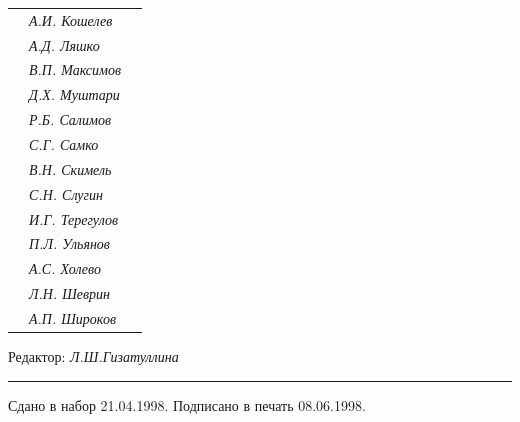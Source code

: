 \begin{tabular}{p{63mm}p{40mm}p{50mm}}
                               &   \it А.И. Кошелев  & \\


                               &   \it А.Д. Ляшко  & \\


                               &   \it В.П. Максимов  & \\


                               &   \it Д.Х. Муштари & \\


                               &   \it Р.Б. Салимов  & \\


                               &   \it С.Г. Самко  & \\


                               &   \it В.Н. Скимель &  \\


                               &   \it С.Н. Слугин  & \\


                               &   \it И.Г. Терегулов  & \\


                               &   \it П.Л. Ульянов  & \\


                               &   \it А.С. Холево  & \\


                               &   \it Л.Н. Шеврин  & \\


                               &   \it А.П. Широков & \\


\end{tabular} 


\bigskip 


\bigskip 


\bigskip 





 


\centerline{Редактор: \it Л.Ш.Гизатуллина}


\bigskip 


\hrule 


\setlength{\hoffset}{-23mm}


\bigskip


\noindent Сдано в набор 21.04.1998. Подписано в печать 08.06.1998.


